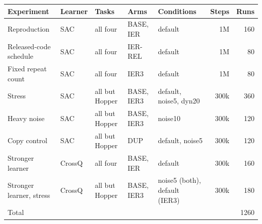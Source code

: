 \begin{tabular}{lllllrr}
\toprule
Experiment & Learner & Tasks & Arms & Conditions & Steps & Runs \\
\midrule
Reproduction & SAC & all four & BASE, IER & default & 1M & 160 \\
Released-code schedule & SAC & all four & IER-REL & default & 1M & 80 \\
Fixed repeat count & SAC & all four & IER3 & default & 1M & 80 \\
Stress & SAC & all but Hopper & BASE, IER3 & default, noise5, dyn20 & 300k & 360 \\
Heavy noise & SAC & all but Hopper & BASE, IER3 & noise10 & 300k & 120 \\
Copy control & SAC & all but Hopper & DUP & default, noise5 & 300k & 120 \\
Stronger learner & CrossQ & all four & BASE, IER & default & 300k & 160 \\
Stronger learner, stress & CrossQ & all but Hopper & BASE, IER3 & noise5 (both), default (IER3) & 300k & 180 \\
\midrule
Total & & & & & & 1260 \\
\bottomrule
\end{tabular}
